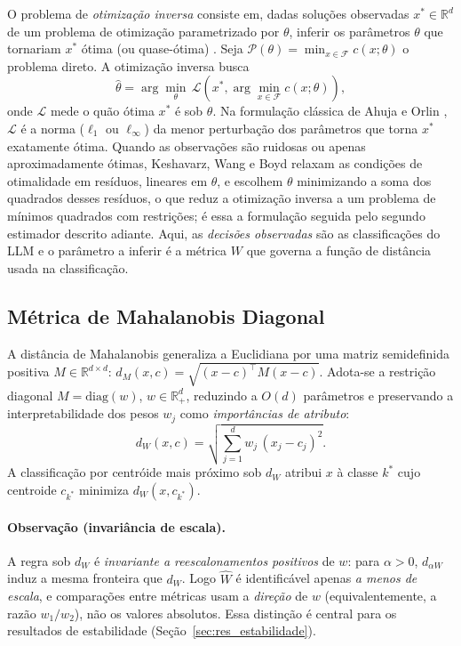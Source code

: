 \documentclass[12pt,a4paper]{article}
\newcommand{\West}{\ensuremath{\hat{W}}}   %
\begin{document}
O problema de \emph{otimização inversa} consiste em, dadas soluções observadas
$x^* \in \mathbb{R}^d$ de um problema de otimização parametrizado por $\theta$, inferir os
parâmetros $\theta$ que tornariam $x^*$ ótima (ou quase-ótima)
\cite{ahujaInverseOptimization2001,chanInverseOptimization2025}.
Seja $\mathcal{P}(\theta) = \min_{x \in \mathcal{F}} c(x; \theta)$ o problema direto. A
otimização inversa busca
\begin{equation}
  \hat{\theta} = \arg\min_{\theta} \,
  \mathcal{L}\!\left(x^*, \arg\min_{x \in \mathcal{F}} c(x; \theta)\right),
\end{equation}
onde $\mathcal{L}$ mede o quão ótima $x^*$ é sob $\theta$. Na formulação clássica de Ahuja
e Orlin \cite{ahujaInverseOptimization2001}, $\mathcal{L}$ é a norma ($\ell_1$ ou
$\ell_\infty$) da menor perturbação dos parâmetros que torna $x^*$ exatamente ótima. Quando
as observações são ruidosas ou apenas aproximadamente ótimas, Keshavarz, Wang e Boyd
\cite{keshavarzImputingConvex2011} relaxam as condições de otimalidade em resíduos,
lineares em $\theta$, e escolhem $\theta$ minimizando a soma dos quadrados desses resíduos,
o que reduz a otimização inversa a um problema de mínimos quadrados com restrições; é essa
a formulação seguida pelo segundo estimador descrito adiante. Aqui, as \emph{decisões
observadas} são as classificações do LLM e o parâmetro a inferir é a métrica $W$ que governa
a função de distância usada na classificação.

\subsection{Métrica de Mahalanobis Diagonal}

A distância de Mahalanobis generaliza a Euclidiana por uma matriz semidefinida positiva
$M \in \mathbb{R}^{d \times d}$: $d_M(x,c) = \sqrt{(x-c)^\top M (x-c)}$. Adota-se a
restrição diagonal $M = \mathrm{diag}(w)$, $w \in \mathbb{R}^d_+$, reduzindo a $O(d)$
parâmetros e preservando a interpretabilidade dos pesos $w_j$ como \emph{importâncias de
atributo}:
\begin{equation}
  d_W(x, c) = \sqrt{\sum_{j=1}^d w_j\,(x_j - c_j)^2}.
  \label{eq:mahalanobis}
\end{equation}
A classificação por centróide mais próximo sob $d_W$ atribui $x$ à classe $k^*$ cujo centroide
$c_{k^*}$ minimiza $d_W(x, c_{k^*})$.

\paragraph{Observação (invariância de escala).}
A regra sob $d_W$ é \emph{invariante a reescalonamentos positivos} de $w$: para $\alpha>0$,
$d_{\alpha W}$ induz a mesma fronteira que $d_W$. Logo \West{} é identificável apenas
\emph{a menos de escala}, e comparações entre métricas usam a \emph{direção} de $w$
(equivalentemente, a razão $w_1/w_2$), não os valores absolutos. Essa distinção é central
para os resultados de estabilidade (Seção~\ref{sec:res_estabilidade}).
\end{document}
